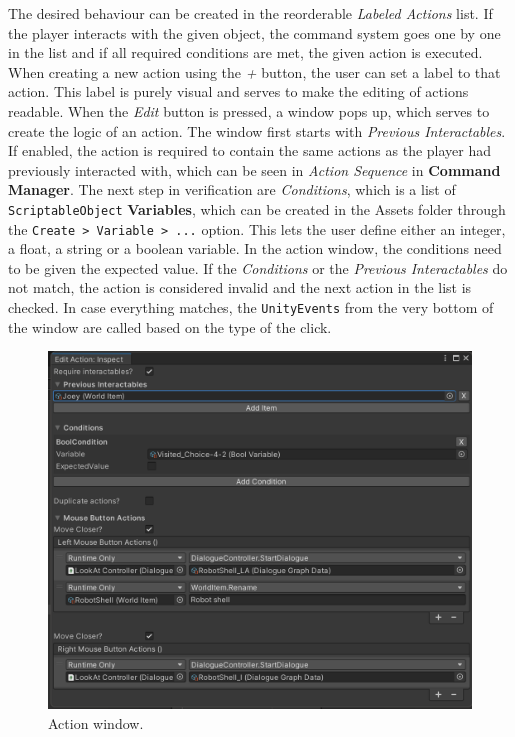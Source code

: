 The desired behaviour can be created in the reorderable \textit{Labeled Actions} list. If the player interacts with the given object, the command system goes one by one in the list and if all required conditions are met, the given action is executed.
When creating a new action using the \textit{+} button, the user can set a label to that action. This label is purely visual and serves to make the editing of actions readable. When the \textit{Edit} button is pressed, a window pops up, which serves to create the logic of an action. The window first starts with \textit{Previous Interactables}. If enabled, the action is required to contain the same actions as the player had previously interacted with, which can be seen in \textit{Action Sequence} in \textbf{Command Manager}. The next step in verification are \textit{Conditions}, which is a list of \verb|ScriptableObject| \textbf{Variables}, which can be created in the Assets folder through the \verb|Create > Variable > ...| option. This lets the user define either an integer, a float, a string or a boolean variable. In the action window, the conditions need to be given the expected value. If the \textit{Conditions} or the \textit{Previous Interactables} do not match, the action is considered invalid and the next action in the list is checked. In case everything matches, the \verb|UnityEvents| from the very bottom of the window are called based on the type of the click.

\begin{figure}[H]
\centering
\includegraphics[width=.8\linewidth]{img/User doc/action_window.png}
\caption{Action window.}
\label{fig:BaSS-manual}
\end{figure}

